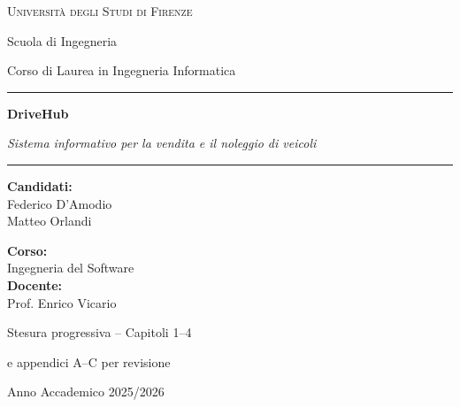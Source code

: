 \documentclass[12pt,a4paper]{report}
\begin{document}
\hypersetup{pageanchor=false}
\begin{titlepage}
  \centering
  {\Large\textsc{Università degli Studi di Firenze}\par}
  {\large Scuola di Ingegneria\par}
  {\large Corso di Laurea in Ingegneria Informatica\par}
  \vspace{2cm}
  \rule{\linewidth}{.5pt}\par\vspace{.8cm}
  {\Huge\bfseries\color{blue!55!black} DriveHub\par}\vspace{.35cm}
  {\Large\itshape Sistema informativo per la vendita e il noleggio di veicoli\par}
  \vspace{.8cm}\rule{\linewidth}{.5pt}\par
  \vspace{1.7cm}
  \begin{minipage}[t]{.48\linewidth}\raggedright
    \textbf{Candidati:}\\[.3cm]
    Federico D'Amodio\\
    Matteo Orlandi
  \end{minipage}\hfill
  \begin{minipage}[t]{.48\linewidth}\raggedleft
    \textbf{Corso:}\\
    Ingegneria del Software\\[.35cm]
    \textbf{Docente:}\\
    Prof. Enrico Vicario
  \end{minipage}
  \vfill
  {\small Stesura progressiva -- Capitoli 1--4\par
  e appendici A--C per revisione\par}
  \vspace{.4cm}
  {\large Anno Accademico 2025/2026\par}
\end{titlepage}
\hypersetup{pageanchor=true}
\tableofcontents
\clearpage
{}





\appendix

\end{document}
